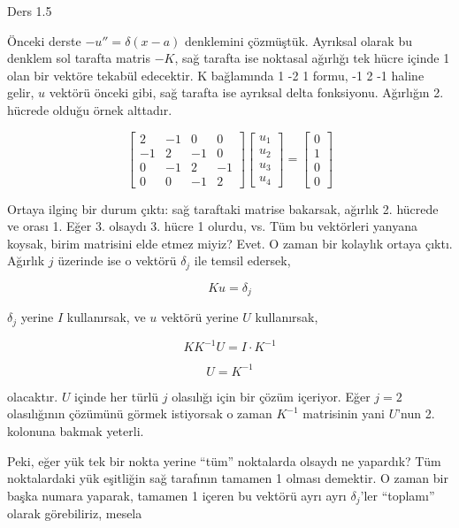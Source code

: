 \documentclass[12pt,fleqn]{article}\usepackage{../../common}
\begin{document}
Ders 1.5

Önceki derste $-u'' = \delta(x-a)$ denklemini çözmüştük. Ayrıksal olarak bu
denklem sol tarafta matris $-K$, sağ tarafta ise noktasal ağırlığı tek
hücre içinde 1 olan bir vektöre tekabül edecektir. K bağlamında 1 -2 1
formu, -1 2 -1 haline gelir, $u$ vektörü önceki gibi, sağ tarafta ise
ayrıksal delta fonksiyonu. Ağırlığın 2. hücrede olduğu örnek alttadır. 

$$  
\left[\begin{array}{rrrr}
2 & -1 & 0 & 0 \\
-1 & 2 & -1 & 0 \\
0 & -1 & 2 & -1 \\
0 & 0 & -1 & 2 
\end{array}\right]
\left[\begin{array}{c}
u_1 \\
u_2 \\
u_3 \\
u_4
\end{array}\right]
=
\left[\begin{array}{c}
0 \\
1 \\
0 \\
0
\end{array}\right]
$$

Ortaya ilginç bir durum çıktı: sağ taraftaki matrise bakarsak, ağırlık
2. hücrede ve orası 1. Eğer 3. olsaydı 3. hücre 1 olurdu, vs. Tüm bu
vektörleri yanyana koysak, birim matrisini elde etmez miyiz? Evet. O zaman
bir kolaylık ortaya çıktı. Ağırlık $j$ üzerinde ise o vektörü $\delta_j$
ile temsil edersek, 

$$ Ku = \delta_j $$

$\delta_j$ yerine $I$ kullanırsak, ve $u$ vektörü yerine $U$ kullanırsak,

$$ KK^{-1}U = I \cdot K^{-1}$$

$$ U = K^{-1} $$

olacaktır. $U$ içinde her türlü $j$ olasılığı için bir çözüm içeriyor. Eğer
$j=2$ olasılığının çözümünü görmek istiyorsak o zaman $K^{-1}$ matrisinin
yani $U$'nun 2. kolonuna bakmak yeterli.

Peki, eğer yük tek bir nokta yerine ``tüm'' noktalarda olsaydı ne yapardık?
Tüm noktalardaki yük eşitliğin sağ tarafının tamamen 1 olması demektir. O
zaman bir başka numara yaparak, tamamen 1 içeren bu vektörü ayrı ayrı
$\delta_j$'ler ``toplamı'' olarak görebiliriz, mesela
\end{document}
